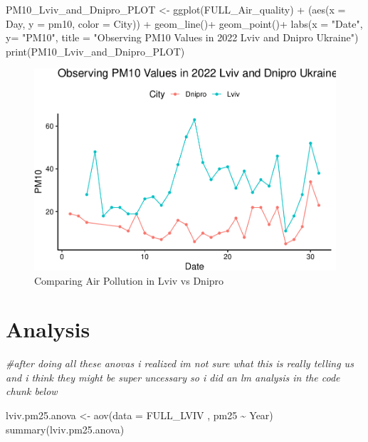 \documentclass[
  12pt,
]{article}
\newenvironment{Shaded}{\begin{snugshade}}{\end{snugshade}}
\newcommand{\AttributeTok}[1]{\textcolor[rgb]{0.77,0.63,0.00}{#1}}
\newcommand{\CommentTok}[1]{\textcolor[rgb]{0.56,0.35,0.01}{\textit{#1}}}
\newcommand{\FunctionTok}[1]{\textcolor[rgb]{0.00,0.00,0.00}{#1}}
\newcommand{\NormalTok}[1]{#1}
\newcommand{\OtherTok}[1]{\textcolor[rgb]{0.56,0.35,0.01}{#1}}
\newcommand{\SpecialCharTok}[1]{\textcolor[rgb]{0.00,0.00,0.00}{#1}}
\newcommand{\StringTok}[1]{\textcolor[rgb]{0.31,0.60,0.02}{#1}}
\begin{document}
\begin{Shaded}
\begin{Highlighting}[]
\NormalTok{PM10\_Lviv\_and\_Dnipro\_PLOT }\OtherTok{\textless{}{-}}
  \FunctionTok{ggplot}\NormalTok{(FULL\_Air\_quality) }\SpecialCharTok{+} 
\NormalTok{(}\FunctionTok{aes}\NormalTok{(}\AttributeTok{x =}\NormalTok{ Day, }\AttributeTok{y =}\NormalTok{ pm10, }\AttributeTok{color =}\NormalTok{ City)) }\SpecialCharTok{+} 
              \FunctionTok{geom\_line}\NormalTok{()}\SpecialCharTok{+}  
  \FunctionTok{geom\_point}\NormalTok{()}\SpecialCharTok{+}
  \FunctionTok{labs}\NormalTok{(}\AttributeTok{x =} \StringTok{"Date"}\NormalTok{, }\AttributeTok{y=} \StringTok{"PM10"}\NormalTok{,}
       \AttributeTok{title =} \StringTok{"Observing PM10 Values in 2022 Lviv and Dnipro Ukraine"}\NormalTok{)  }
\FunctionTok{print}\NormalTok{(PM10\_Lviv\_and\_Dnipro\_PLOT)}
\end{Highlighting}
\end{Shaded}

\begin{figure}
\centering
\includegraphics{Fontanie_Gordon_Weinberg_Project_files/figure-latex/Plotting Lviv vs Dnipro-2.pdf}
\caption{Comparing Air Pollution in Lviv vs Dnipro}
\end{figure}

\newpage

\hypertarget{analysis}{%
\section{Analysis}\label{analysis}}

\begin{Shaded}
\begin{Highlighting}[]
\CommentTok{\#after doing all these anovas i realized im not sure what this is really telling us and i think they might be super uncessary so i did an lm analysis in the code chunk below}

\NormalTok{lviv.pm25.anova }\OtherTok{\textless{}{-}} \FunctionTok{aov}\NormalTok{(}\AttributeTok{data =}\NormalTok{ FULL\_LVIV , pm25 }\SpecialCharTok{\textasciitilde{}}\NormalTok{ Year)}
\FunctionTok{summary}\NormalTok{(lviv.pm25.anova)}
\end{Highlighting}
\end{Shaded}
\end{document}
